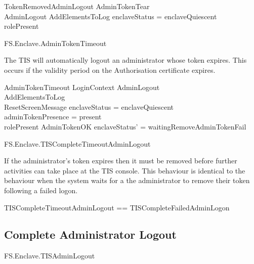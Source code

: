 \begin{schema}{TokenRemovedAdminLogout}
        AdminTokenTear
\\      AdminLogout
\also
        AddElementsToLog
\where
        enclaveStatus = enclaveQuiescent 
\\      rolePresent \neq \Nil
\end{schema}

\begin{traceunit}{FS.Enclave.AdminTokenTimeout}
\end{traceunit}


The TIS will automatically logout an administrator whose token
expires. This occurs if the validity period on the Authorisation
certificate expires.

\begin{schema}{AdminTokenTimeout}
        LoginContext
\also
        AdminLogout
\\      AddElementsToLog
\\      ResetScreenMessage
\where
        enclaveStatus = enclaveQuiescent 
\\      adminTokenPresence = present
\\      rolePresent \neq \Nil
\also
        \lnot AdminTokenOK
\also
        enclaveStatus' = waitingRemoveAdminTokenFail
\end{schema}

\begin{traceunit}{FS.Enclave.TISCompleteTimeoutAdminLogout}
\end{traceunit}

If the administrator's token expires then it must be removed before
further activities can take place at the TIS console. This behaviour
is identical to the behaviour when the system waits for a the
administrator to remove their token following a failed logon.

\begin{zed}
TISCompleteTimeoutAdminLogout == TISCompleteFailedAdminLogon
\end{zed}

\subsection{Complete Administrator Logout}

\begin{traceunit}{FS.Enclave.TISAdminLogout}
\end{traceunit}

